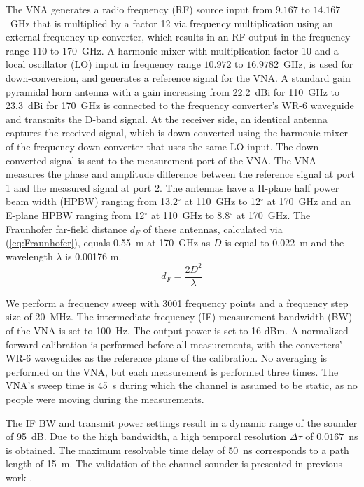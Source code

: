 \documentclass[preprint]{rsl}
\begin{document}
The VNA generates a radio frequency (RF) source input from $9.167$ to $14.167$~GHz that is multiplied by a factor 12 via frequency multiplication using an external frequency up-converter, which results in an RF output in the frequency range 110 to 170~GHz. 
A harmonic mixer with multiplication factor 10 and a local oscillator (LO) input in frequency range $10.972$ to $16.9782$~GHz, is used for down-conversion, and generates a reference signal for the VNA. 
A standard gain pyramidal horn antenna with a gain increasing from 22.2~dBi for 110~GHz  to 23.3~dBi for 170~GHz is connected to the frequency converter's WR-6 waveguide and transmits the D-band signal.
At the receiver side, an identical antenna captures the received signal, which is down-converted using the harmonic mixer of the frequency down-converter that uses the same LO input. 
The down-converted signal is sent to the measurement port of the VNA. 
The VNA measures the phase and amplitude difference between the reference signal at port 1 and the measured signal at port 2.
The antennas have a H-plane half power beam width (HPBW) ranging from 13.2$^{\circ}$ at 110~GHz to 12$^{\circ}$ at 170~GHz and an E-plane HPBW ranging from 12$^{\circ}$ at 110~GHz to 8.8$^{\circ}$ at 170~GHz. 
The Fraunhofer far-field distance $d_F$ of these antennas, calculated via (\ref{eq:Fraunhofer}), equals 0.55~m at 170~GHz as $D$ is equal to 0.022~m and the wavelength $\lambda$ is 0.00176 m.
\begin{equation}
\label{eq:Fraunhofer}
d_F = \frac{2 D^2}{\lambda}
\end{equation}

We perform a frequency sweep with 3001 frequency points and a frequency step size of 20~MHz. 
The intermediate frequency (IF) measurement bandwidth (BW) of the VNA is set to 100~Hz. 
The output power is set to 16 dBm.
A normalized forward calibration is performed before all measurements, with the converters' WR-6 waveguides as the reference plane of the calibration. 
No averaging is performed on the VNA, but each measurement is performed three times.
The VNA's sweep time is 45~s during which the channel is assumed to be static, as no people were moving during the measurements. 

The IF BW and transmit power settings result in a dynamic range of the sounder of 95~dB.
Due to the high bandwidth, a high temporal resolution $\Delta\tau$ of $0.0167$~ns is obtained.
The maximum resolvable time delay of 50~ns corresponds to a path length of 15~m.
The validation of the channel sounder is presented in previous work \cite{DeBeelde2021}. 
\end{document}
